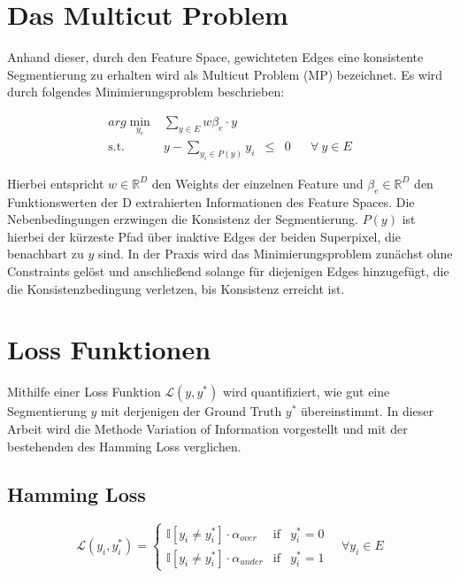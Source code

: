 \section{Das Multicut Problem}\label{sec:multicutProb}

Anhand dieser, durch den Feature Space, gewichteten Edges eine konsistente Segmentierung zu erhalten wird als Multicut Problem (MP) bezeichnet. Es wird durch folgendes Minimierungsproblem beschrieben: 


\begin{equation} 
\begin{array}{rrclcl}
\displaystyle arg \min_{y_e} & \sum\limits_{y \in E} w \beta_e \cdot y \\
\textrm{s.t.} &  y - \sum\limits_{y_i \in P(y)} y_i & \le & 0 & & \forall \ y \in E
\end{array}
\end{equation}

Hierbei entspricht $w \in \mathbb{R}^D$ den Weights der einzelnen Feature und $\beta_e \in \mathbb{R}^D$ den Funktionswerten der D extrahierten Informationen des Feature Spaces. Die Nebenbedingungen erzwingen die Konsistenz der Segmentierung. $P(y)$ ist hierbei der kürzeste Pfad über inaktive Edges der beiden Superpixel, die benachbart zu $y$ sind. In der Praxis wird das Minimierungsproblem zunächst ohne Constraints gelöst und anschließend solange für diejenigen Edges hinzugefügt, die die Konsistenzbedingung verletzen, bis Konsistenz erreicht ist.

\section{Loss Funktionen}

Mithilfe einer Loss Funktion $\mathcal{L}(y, y^*)$ wird quantifiziert, wie gut eine Segmentierung $y$ mit derjenigen der Ground Truth $y^*$ übereinstimmt. In dieser Arbeit wird die Methode Variation of Information vorgestellt und mit der bestehenden des Hamming Loss verglichen.

\subsection{Hamming Loss}

\begin{equation}
\mathcal{L}(y_i, y_i^*) = \left\{ \begin{array}{lcc}  
\mathbb{I}[y_i \neq y_i^*] \cdot \alpha_{over} & \text{if} & y_i^* = 0  \\ 
\mathbb{I}[y_i \neq y_i^*] \cdot \alpha_{under} & \text{if} & y_i^* = 1         
\end{array}  \right.  \quad \forall y_i \in E 
\end{equation}

